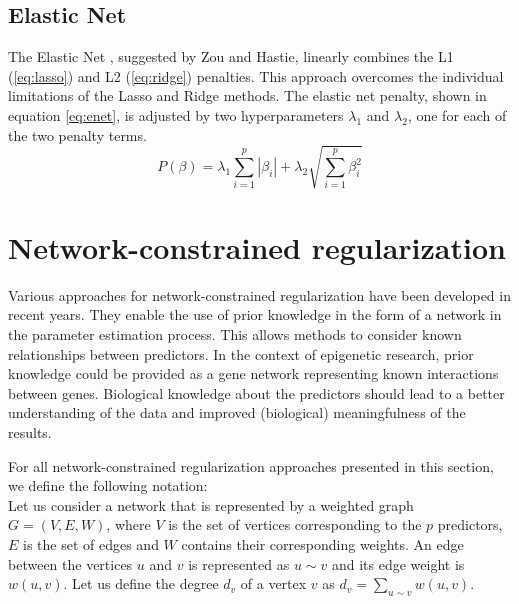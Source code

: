 \subsection{Elastic Net} \label{sec:enet}
The Elastic Net \cite{zou2005regularization}, suggested by Zou and Hastie, linearly combines the L1 (\ref{eq:lasso}) and L2 (\ref{eq:ridge}) penalties. This approach overcomes the individual limitations of the Lasso and Ridge methods. The elastic net penalty, shown in equation \ref{eq:enet}, is adjusted by two hyperparameters $\lambda_1$ and $\lambda_2$, one for each of the two penalty terms.
\begin{equation} \label{eq:enet}
P(\beta) = \lambda_1\sum_{i=1}^{p}\left|\beta_i\right| + \lambda_2\sqrt{\sum_{i=1}^{p}\beta_i^2}
\end{equation}


\section{Network-constrained regularization}
Various approaches for network-constrained regularization have been developed in recent years. They enable the use of prior knowledge in the form of a network in the parameter estimation process. This allows methods to consider known relationships between predictors. In the context of epigenetic research, prior knowledge could be provided as a gene network representing known interactions between genes. Biological knowledge about the predictors should lead to a better understanding of the data and improved (biological) meaningfulness of the results.

For all network-constrained regularization approaches presented in this section, we define the following notation:\\
Let us consider a network that is represented by a weighted graph $G = (V, E, W)$, where $V$ is the set of vertices corresponding to the $p$ predictors, $E$ is the set of edges and $W$ contains their corresponding weights. An edge between the vertices $u$ and $v$ is represented as $u \sim v$ and its edge weight is $w(u,v)$. Let us define the degree $d_v$ of a vertex $v$ as $d_v = \sum_{u \sim v}w(u,v)$.


